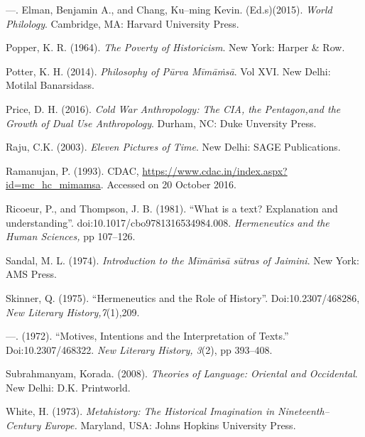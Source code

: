 \begin{thebibliography}{99}
  —. Elman, Benjamin A., and Chang, Ku–ming Kevin. (Ed.s)(2015). \textit{World Philology}. Cambridge, MA: Harvard University Press.

  Popper, K. R. (1964). \textit{The Poverty of Historicism}. New York: Harper \& Row.

  Potter, K. H. (2014). \textit{Philosophy of Pūrva Mīmāṁsā}. Vol XVI. New Delhi: Motilal Banarsidass.

  Price, D. H. (2016). \textit{Cold War Anthropology: The CIA, the Pentagon,and the Growth of Dual Use Anthropology}. Durham, NC: Duke Unversity Press.

  Raju, C.K. (2003). \textit{Eleven Pictures of Time}. New Delhi: SAGE Publications.

  Ramanujan, P. (1993). CDAC, \url{https://www.cdac.in/index.aspx?id=mc_hc_mimamsa}. Accessed on 20 October 2016.

  Ricoeur, P., and Thompson, J. B. (1981). “What is a text? Explanation and understanding”. doi:10.1017/cbo9781316534984.008. \textit{Hermeneutics and the Human Sciences,} pp 107–126.

  Sandal, M. L. (1974). \textit{Introduction to the Mīmāṁsā sūtras of Jaimini}. New York: AMS Press.

  Skinner, Q. (1975). “Hermeneutics and the Role of History”. Doi:10.2307/468286, \textit{New Literary History,7}(1),209.

  —. (1972). “Motives, Intentions and the Interpretation of Texts.” Doi:10.2307/468322. \textit{New Literary History, 3}(2), pp 393–408.

  Subrahmanyam, Korada. (2008). \textit{Theories of Language: Oriental and Occidental}. New Delhi: D.K. Printworld.

  White, H. (1973). \textit{Metahistory: The Historical Imagination in Nineteenth–Century Europe.} Maryland, USA: Johns Hopkins University Press.

 \end{thebibliography}


